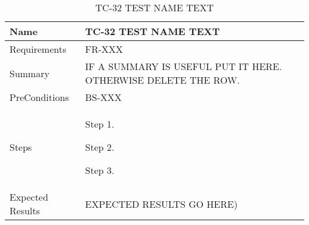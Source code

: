\begin{table}[htbp!]
\centering
      \begin{tabular}{|p{1.05 in} |p{4.75 in} |}
      \hline
         \rowcolor[rgb]{0.8,0.8,0.8} Name & TC-32 TEST NAME TEXT\\
         \hline
         Requirements & FR-XXX\\  \hline
         Summary & IF A SUMMARY IS USEFUL PUT IT HERE.  OTHERWISE DELETE THE ROW.\\  \hline
         PreConditions & BS-XXX\\     \hline
         Steps &
         \begin{compactenum}
             \item Step 1.
             \item Step 2.
             \item Step 3.
         \end{compactenum}
         \\ \hline
         Expected Results & EXPECTED RESULTS GO HERE)\\
      \hline
      \end{tabular}
      \label{Table:TC-32}
      \caption{TC-32 TEST NAME TEXT}
\end{table} 